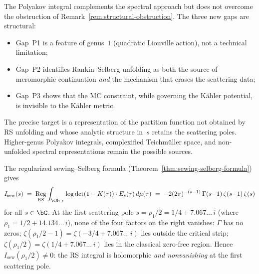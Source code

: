 \begin{remark}%
\label{rem:honest-comparison}%
%
The Polyakov integral complements the spectral approach but
does not overcome the obstruction of
Remark~\ref{rem:structural-obstruction}.
The three new gaps are structural:
\begin{itemize}[nosep]
\item Gap~P1 is a feature of genus~$1$ (quadratic Liouville
 action), not a technical limitation;
\item Gap~P2 identifies Rankin--Selberg unfolding as both
 the source of meromorphic continuation \emph{and} the
 mechanism that erases the scattering data;
\item Gap~P3 shows that the MC constraint, while governing
 the K\"ahler potential, is invisible to the K\"ahler
 metric.
\end{itemize}
The precise target is a representation of the partition function not
obtained by RS unfolding and whose analytic structure in~$s$ retains
the scattering poles. Higher-genus Polyakov integrals, complexified
Teichm\"uller space, and non-unfolded spectral representations remain
the possible sources.
\end{remark}

\begin{corollary}%
\label{cor:first-scattering-pole}%
\ClaimStatusProvedHere%
%
The regularized sewing--Selberg formula
(Theorem~\ref{thm:sewing-selberg-formula}) gives
\[
 I_{\mathrm{sew}}(s)
 \;=\;
 \operatorname*{Reg}_{\mathrm{RS}}\int_{\cM_{1,1}}
 \log\det(1-K(\tau))\cdot E_s(\tau)\,d\mu(\tau)
 \;=\;
 -2(2\pi)^{-(s-1)}\,\Gamma(s{-}1)\,\zeta(s{-}1)\,\zeta(s)
\]
for all $s\in\bC$. At the first scattering pole
$s = \rho_1/2 = 1/4 + 7.067\ldots\,i$
\textup{(}where $\rho_1 = 1/2 + 14.134\ldots\,i$\textup{)},
none of the four factors on the right vanishes:
$\Gamma$ has no zeros\textup;
$\zeta(\rho_1/2 - 1) = \zeta(-3/4 + 7.067\ldots\,i)$ lies
outside the critical strip\textup;
$\zeta(\rho_1/2) = \zeta(1/4 + 7.067\ldots\,i)$ lies
in the classical zero-free region.
Hence $I_{\mathrm{sew}}(\rho_1/2) \ne 0$: the RS integral is
holomorphic \emph{and nonvanishing} at the first scattering
pole.
\end{corollary}

